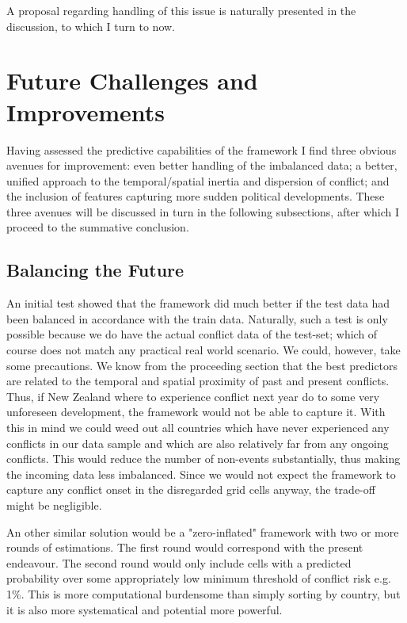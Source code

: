 \documentclass[a4paper]{article}
\begin{document}
A proposal regarding handling of this issue is naturally presented in the discussion, to which I turn to now.\par

\section{Future Challenges and Improvements}

Having assessed the predictive capabilities of the framework I find three obvious avenues for improvement: even better handling of the imbalanced data; a better, unified approach to the temporal/spatial inertia and dispersion of conflict; and the inclusion of features capturing more sudden political developments. These three avenues will be discussed in turn in the following subsections, after which I proceed to the summative conclusion.

\subsection{Balancing the Future}
An initial test showed that the framework did much better if the test data had been balanced in accordance with the train data. Naturally, such a test is only possible because we do have the actual conflict data of the test-set; which of course does not match any practical real world scenario. We could, however, take some precautions. We know from the proceeding section that the best predictors are related to the temporal and spatial proximity of past and present conflicts. Thus, if New Zealand where to experience conflict next year do to some very unforeseen development, the framework would not be able to capture it. With this in mind we could weed out all countries which have never experienced any conflicts in our data sample and which are also relatively far from any ongoing conflicts. This would reduce the number of non-events substantially, thus making the incoming data less imbalanced. Since we would not expect the framework to capture any conflict onset in the disregarded grid cells anyway, the trade-off might be negligible.\par

An other similar solution would be a "zero-inflated" framework with two or more rounds of estimations. The first round would correspond with the present endeavour. The second round would only include cells with a predicted probability over some appropriately low minimum threshold of conflict risk e.g. 1\%. This is more computational burdensome than simply sorting by country, but it is also more systematical and potential more powerful.\par  
\end{document}
